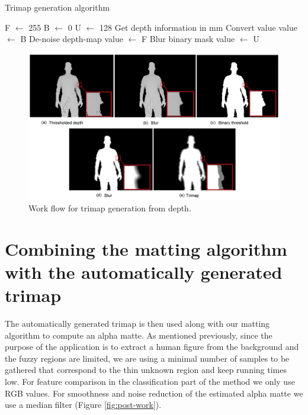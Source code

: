 \begin{algorithm}
\caption{Trimap generation algorithm}\label{trimap-algorithm}
\begin{algorithmic}[1]
\State F $\gets$ 255
\State B $\gets$ 0
\State U $\gets$ 128
\State Get depth information in mm
\State Convert value
\EndFor
{}
\State value $\gets$ B
\EndIf
\EndFor
\State De-noise depth-map
\State value $\gets$ F
\EndIf
\EndFor
\State Blur binary mask
\State value $\gets$ U
\EndIf
\EndFor
\end{algorithmic}
\end{algorithm}

\begin{figure}[t!]
\centering
\includegraphics[width=1\columnwidth]{Chapter6/6/depth_work.png}
\caption[Work flow for trimap generation from depth.]{Work flow for trimap generation from depth.}
\label{fig:depth-work}
\end{figure}

\section{Combining the matting algorithm with the automatically generated trimap}
\label{sec:combining-matting-algorithm-with-trimap}

The automatically generated trimap is then used along with our matting algorithm to compute an alpha matte. As mentioned previously, since the purpose of the application is to extract a human figure from the background and the fuzzy regions are limited, we are using a minimal number of samples to be gathered that correspond to the thin unknown region and keep running times low. For feature comparison in the classification part of the method we only use RGB values. For smoothness and noise reduction of the estimated alpha matte we use a median filter (Figure \ref{fig:post-work}).

